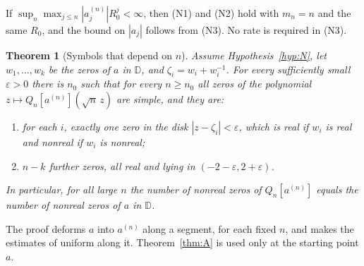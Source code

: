 \documentclass[11pt]{amsart}
\newtheorem{theorem}{Theorem}[section]
\theoremstyle{definition}
\theoremstyle{remark}
\numberwithin{equation}{section}
\newcommand{\D}{\mathbb{D}}
\newcommand{\eps}{\varepsilon}
\begin{document}
If $\sup_n\max_{j\le n}|a^{(n)}_j|R_0^j<\infty$, then (N1) and (N2) hold with $m_n=n$ and the same $R_0$, and the bound on $|a_j|$ follows from (N3). No rate is required in (N3).

\begin{theorem}[Symbols that depend on $n$]\label{thm:moving}
Assume Hypothesis~\ref{hyp:N}, let $w_1,\dots,w_k$ be the zeros of $a$ in $\D$, and $\zeta_i=w_i+w_i^{-1}$. For every sufficiently small $\eps>0$ there is $n_0$ such that for every $n\ge n_0$ all zeros of the polynomial $z\mapsto Q_n[a^{(n)}](\sqrt n\,z)$ are simple, and they are:
\begin{enumerate}
\item[(a)] for each $i$, exactly one zero in the disk $|z-\zeta_i|<\eps$, which is real if $w_i$ is real and nonreal if $w_i$ is nonreal;
\item[(b)] $n-k$ further zeros, all real and lying in $(-2-\eps,2+\eps)$.
\end{enumerate}
In particular, for all large $n$ the number of nonreal zeros of $Q_n[a^{(n)}]$ equals the number of nonreal zeros of $a$ in $\D$.
\end{theorem}

The proof deforms $a$ into $a^{(n)}$ along a segment, for each fixed $n$, and makes the estimates of \cite[Propositions~{\ref{M-prop:bulk}} and~{\ref{M-prop:exterior}}]{Main} uniform along it. Theorem~\ref{thm:A} is used only at the starting point $a$.
\end{document}
